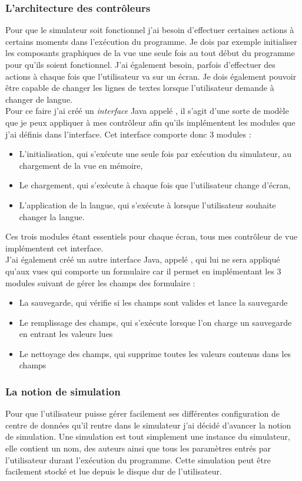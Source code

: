 \subsubsection{L'architecture des contrôleurs}
Pour que le simulateur soit fonctionnel j'ai besoin d'effectuer certaines actions à certains moments dans l'exécution du programme. Je dois par exemple initialiser les composants graphiques de la vue une seule fois au tout début du programme pour qu'ils soient fonctionnel. J'ai également besoin, parfois d'effectuer des actions à chaque fois que l'utilisateur va sur un écran. Je dois également pouvoir être capable de changer les lignes de textes lorsque l'utilisateur demande à changer de langue.\\
Pour ce faire j'ai créé un \emph{interface} Java appelé , il s'agit d'une sorte de modèle que je peux appliquer à mes contrôleur afin qu'ils implémentent les modules que j'ai définis dans l'interface. Cet interface comporte donc 3 modules :
\begin{itemize}
	\item L'initialisation, qui s'exécute une seule fois par exécution du simulateur, au chargement de la vue en mémoire,
	\item Le chargement, qui s'exécute à chaque fois que l'utilisateur change d'écran,
	\item L'application de la langue, qui s'exécute à lorsque l'utilisateur souhaite changer la langue.
\end{itemize}
Ces trois modules étant essentiels pour chaque écran, tous mes contrôleur de vue implémentent cet interface.\\

J'ai également créé un autre interface Java, appelé , qui lui ne sera appliqué qu'aux vues qui comporte un formulaire car il permet en implémentant les 3 modules suivant de gérer les champs des formulaire :
\begin{itemize}
	\item La sauvegarde, qui vérifie si les champs sont valides et lance la sauvegarde
	\item Le remplissage des champs, qui s'exécute lorsque l'on charge un sauvegarde en entrant les valeurs lues
	\item Le nettoyage des champs, qui supprime toutes les valeurs contenus dans les champs
\end{itemize} 

\subsubsection{La notion de simulation}
Pour que l'utilisateur puisse gérer facilement ses différentes configuration de centre de données qu'il rentre dans le simulateur j'ai décidé d'avancer la notion de simulation. Une simulation est tout simplement une instance du simulateur, elle contient un nom, des auteurs ainsi que tous les paramètres entrés par l'utilisateur durant l'exécution du programme. Cette simulation peut être facilement stocké et lue depuis le disque dur de l'utilisateur.\\

